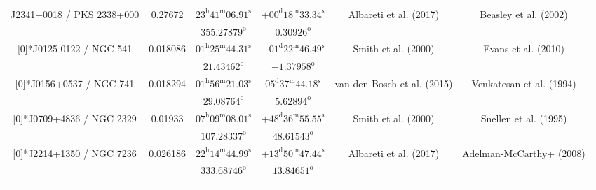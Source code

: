 \begin{landscape}
\begin{longtable}{cccccc}
 \multirow{2}[0]{*}{J2341+0018 / PKS 2338+000} & \multirow{2}[0]{*}{0.27672} &  
    $23^\text{h}41^\text{m}06.91^\text{s}$  & $+00^\text{d}18^\text{m}33.34^\text{s}$  & 
    \multirow{2}[0]{*}{Albareti et al. (2017)\cite{RedRef9_2017}}& \multirow{2}[0]{*}{Beasley et al. (2002)\cite{CoordRef4_2002}} \\*
    & & $355.27879^\text{o}$ & $0.30926^\text{o}$ & & \\ \addlinespace 


  \multirow{2}[0]{*}{J0125-0122 / NGC 541} & \multirow{2}[0]{*}{0.018086} &  
    $01^\text{h}25^\text{m}44.31^\text{s}$  & $-01^\text{d}22^\text{m}46.49^\text{s}$  & 
    \multirow{2}[0]{*}{Smith et al. (2000)\cite{RedRef52_2000}}& \multirow{2}[0]{*}{Evans et al. (2010) \cite{CoordRef1_2010}} \\*
     & & $21.43462^\text{o}$ & $-1.37958^\text{o}$ & & \\ \addlinespace 

  \multirow{2}[0]{*}{J0156+0537 / NGC 741} & \multirow{2}[0]{*}{0.018294} &  
    $01^\text{h}56^\text{m}21.03^\text{s}$  & $05^\text{d}37^\text{m}44.18^\text{s}$  & 
    \multirow{2}[0]{*}{van den Bosch et al. (2015)\cite{RedRef90_2015}}& \multirow{2}[0]{*}{Venkatesan et al. (1994) \cite{CoordRef94_1994}} \\*
    & & $29.08764^\text{o}$ & $5.62894^\text{o}$ & & \\ \addlinespace 

 \multirow{2}[0]{*}{J0709+4836 / NGC 2329} & \multirow{2}[0]{*}{0.01933} &  
    $07^\text{h}09^\text{m}08.01^\text{s}$  & $+48^\text{d}36^\text{m}55.55^\text{s}$  & 
    \multirow{2}[0]{*}{Smith et al. (2000)\cite{RedRef52_2000}}& \multirow{2}[0]{*}{Snellen et al. (1995) \cite{CoordRef95_1995}} \\*
    & & $107.28337^\text{o}$ & $48.61543^\text{o}$ & & \\ \addlinespace 

  \multirow{2}[0]{*}{J2214+1350 / NGC 7236} & \multirow{2}[0]{*}{0.026186} &  
    $22^\text{h}14^\text{m}44.99^\text{s}$  & $+13^\text{d}50^\text{m}47.44^\text{s}$  & 
     \multirow{2}[0]{*}{Albareti et al. (2017)\cite{RedRef9_2017}}& \multirow{2}[0]{*}{Adelman-McCarthy+ (2008) \cite{CoordRef28_2008}} \\*
     & & $333.68746^\text{o}$ & $13.84651^\text{o}$ & & \\ \addlinespace 



\end{longtable}
\end{landscape}
